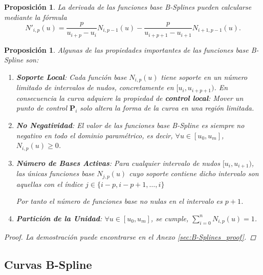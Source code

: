 \documentclass[11pt]{book}
\theoremstyle{plain} %
\newtheorem{proposicion}[teorema]{Proposición}
\theoremstyle{definition} %
\theoremstyle{definition} %
\begin{document}
\begin{proposicion}
    La derivada de las funciones base B-Splines pueden calcularse mediante la fórmula
    $$N'_{i,p}(u) = \frac{p}{u_{i+p} - u_i} N_{i,p-1}(u) - \frac{p}{u_{i+p+1} - u_{i+1}} N_{i+1,p-1}(u).$$
\end{proposicion}

\vspace{-0.35cm}


\begin{proposicion}
    Algunas de las propiedades importantes de las funciones base B-Spline son:
    \label{prop:bspline_basis_fundamentales}
    \begin{enumerate}
        \item \textbf{Soporte Local}: Cada función base $N_{i,p}(u)$ tiene soporte en un número limitado de intervalos de nudos, concretamente en $[u_i, u_{i+p+1})$. En consecuencia la curva adquiere la propiedad de \textbf{control local}: Mover un punto de control $\mathbf{P}_i$ solo altera la forma de la curva en una región limitada.
        
        \item \textbf{No Negatividad}: El valor de las funciones base B-Spline es siempre no negativo en todo el dominio paramétrico, es decir, $\forall u \in [u_0, u_m]$, $N_{i,p}(u) \geq 0$.

        \item \textbf{Número de Bases Activas}:  Para cualquier intervalo de nudos $[u_i, u_{i+1})$, las únicas funciones base $N_{j,p}(u)$ cuyo soporte contiene dicho intervalo son aquellas con el índice $j \in \{i-p, i-p+1, \ldots, i\}$

        
        Por tanto el número de funciones base no nulas en el intervalo es $p+1$.

        \item \textbf{Partición de la Unidad}: $\forall u\in [u_0, u_m]$, se cumple,
        $\sum_{i=0}^{n} N_{i,p}(u) = 1$.
    \end{enumerate}
    \begin{proof}
        La demostración puede encontrarse en el Anexo \ref{sec:B-Splines_proof}.
    \end{proof}
\end{proposicion}

\vspace{-0.5cm}

\subsection{Curvas B-Spline}
\end{document}
